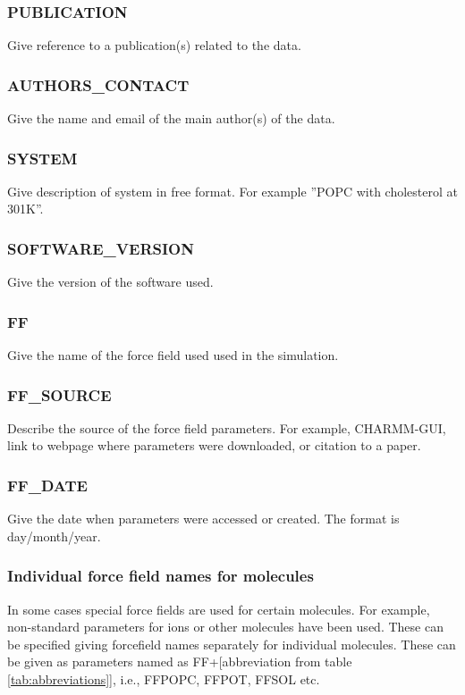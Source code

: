 \documentclass[fleqn,10pt]{wlscirep}
\begin{document}
\subsubsection*{PUBLICATION}
Give reference to a publication(s) related to the data.

\subsubsection*{AUTHORS\_CONTACT}
Give the name and email of the main author(s) of the data.

\subsubsection*{SYSTEM}
Give description of system in free format. For example ''POPC with cholesterol at 301K''.


\subsubsection*{SOFTWARE\_VERSION}
Give the version of the software used.

\subsubsection*{FF}
Give the name of the force field used used in the simulation.

\subsubsection*{FF\_SOURCE}
Describe the source of the force field parameters. For example, CHARMM-GUI, link to webpage where parameters were downloaded, or citation to a paper.

\subsubsection*{FF\_DATE}
Give the date when parameters were accessed or created. The format is day/month/year.

\subsubsection*{Individual force field names for molecules}
In some cases special force fields are used for certain molecules. For example, non-standard parameters for ions or other molecules have been used. These can be specified giving forcefield names separately for individual molecules. These can be given as parameters named as
FF+[abbreviation from table \ref{tab:abbreviations}], i.e., FFPOPC, FFPOT, FFSOL etc.
\end{document}

